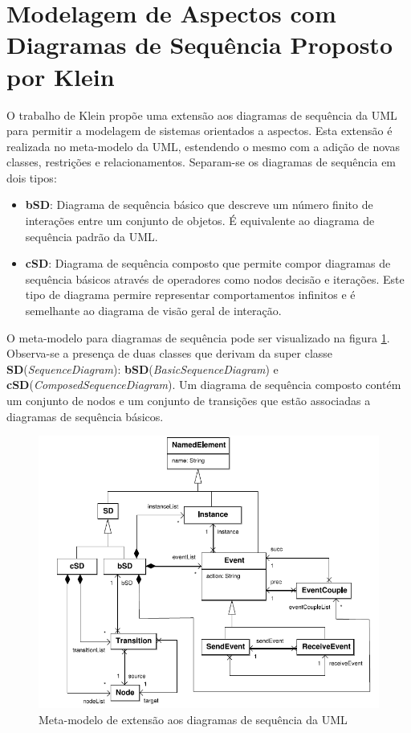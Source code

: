 \section{Modelagem de Aspectos com Diagramas de Sequência Proposto por Klein}

O trabalho de Klein \cite{Klein:2007:WMA:1805812.1805819} \cite{Klein:2006:SWS:1119655.1119662} propõe uma extensão aos diagramas de sequência da UML para permitir a modelagem
de sistemas orientados a aspectos. Esta extensão é realizada no meta-modelo da UML, estendendo o mesmo com a adição de novas classes, restrições e
relacionamentos. Separam-se os diagramas de sequência em dois tipos:

\begin{itemize}
  \item \textbf{bSD}: Diagrama de sequência básico que descreve um número finito de interações entre um conjunto de objetos. É equivalente ao diagrama
  de sequência padrão da UML.
  \item \textbf{cSD}: Diagrama de sequência composto que permite compor diagramas de sequência básicos através de operadores como nodos decisão
  e iterações. Este tipo de diagrama permire representar comportamentos infinitos e é semelhante ao diagrama de visão geral de interação.
\end{itemize}

O meta-modelo para diagramas de sequência pode ser visualizado na figura \ref{fig:klein_meta_model}. Observa-se a presença de duas classes que
derivam da super classe \textbf{SD}(\textit{SequenceDiagram}): \textbf{bSD}(\textit{BasicSequenceDiagram}) e
\textbf{cSD}(\textit{ComposedSequenceDiagram}). Um diagrama de sequência composto contém um conjunto de nodos e um conjunto de transições que estão
associadas a diagramas de sequência básicos.

\begin{figure}
	\centering
	\includegraphics[width=475px]{img/klein_meta_model.png}
	\caption{Meta-modelo de extensão aos diagramas de
	sequência da UML}\label{fig:klein_meta_model}
\end{figure}

